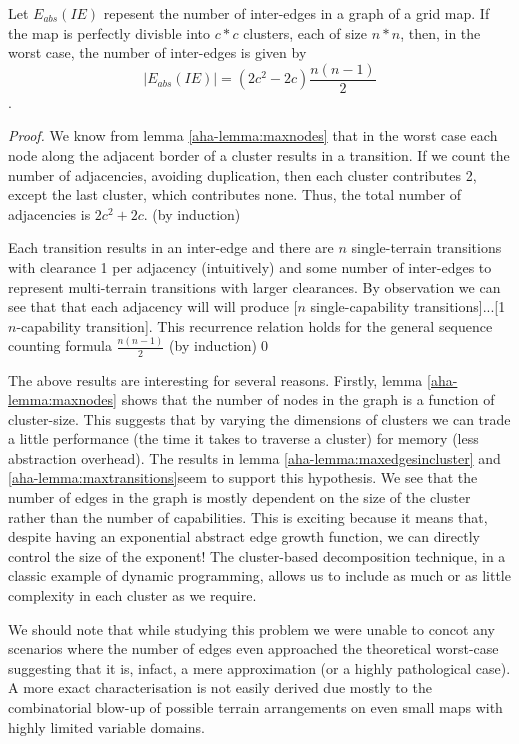 \begin{lemma}
\label{aha-lemma:maxtransitions}
Let $E_{abs}(IE)$ repesent the number of inter-edges in a graph of a grid map. If the map is perfectly divisble into $c*c$ clusters, each of size $n*n$, then, in the worst case, the number of inter-edges is given by 
$$|E_{abs}(IE)| = (2c^2 - 2c)\frac{n(n-1)}{2}$$.
\end{lemma}

\begin{proof}
We know from lemma \ref{aha-lemma:maxnodes} that in the worst case each node along the adjacent border of a cluster results in a transition. 
If we count the number of adjacencies, avoiding duplication, then each cluster contributes 2, except the last cluster, which contributes none. 
Thus, the total number of adjacencies is $2c^2 + 2c$. (by induction) 
\par \indent
Each transition results in an inter-edge and there are $n$ single-terrain transitions with clearance 1 per adjacency (intuitively) and some number of inter-edges to represent multi-terrain transitions with larger clearances. 
By observation we can see that that each adjacency will will produce [$n$ single-capability transitions]...[1 $n$-capability transition]. 
This recurrence relation holds for the general sequence counting formula $\frac{n(n-1)}{2}$ (by induction)\qed
\end{proof}

The above results are interesting for several reasons. 
Firstly, lemma \ref{aha-lemma:maxnodes} shows that the number of nodes in the graph is a function of cluster-size. This suggests that by varying the dimensions of clusters we can trade a little performance (the time it takes to traverse a cluster) for memory (less abstraction overhead).
The results in lemma \ref{aha-lemma:maxedgesincluster} and \ref{aha-lemma:maxtransitions}seem to support this hypothesis. 
We see that the number of edges in the graph is mostly dependent on the size of the cluster rather than the number of capabilities. 
This is exciting because it means that, despite having an exponential abstract edge growth function, we can directly control the size of the exponent! 
The cluster-based decomposition technique, in a classic example of dynamic programming, allows us to include as much or as little complexity in each cluster as we require.
\par \indent
We should note that while studying this problem we were unable to concot any scenarios where the number of edges even approached the theoretical worst-case suggesting that it is, infact, a mere approximation (or a highly pathological case).  A more exact characterisation is not easily derived due mostly to the combinatorial blow-up of possible terrain arrangements on even small maps with highly limited variable domains.
